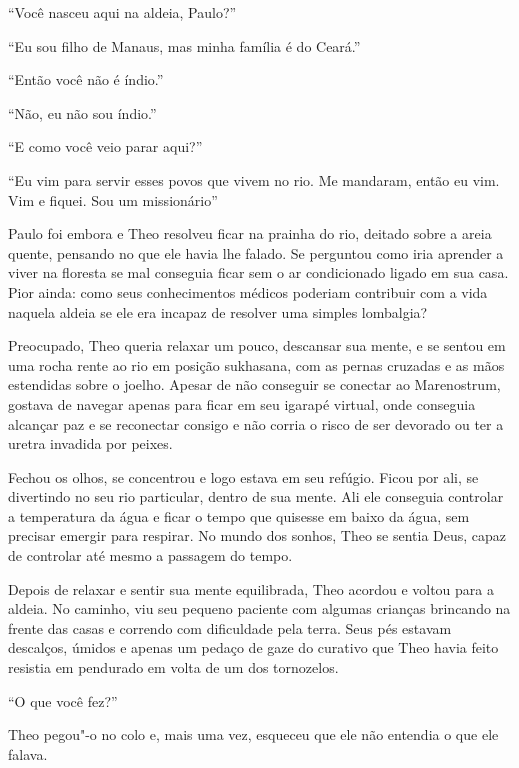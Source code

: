 ``Você nasceu aqui na aldeia, Paulo?''

``Eu sou filho de Manaus, mas minha família é do Ceará.''

``Então você não é índio.''

``Não, eu não sou índio.''

``E como você veio parar aqui?''

``Eu vim para servir esses povos que vivem no rio. Me mandaram, então eu
vim. Vim e fiquei. Sou um missionário''

\asterisc


Paulo foi embora e Theo resolveu ficar na prainha do rio, deitado sobre
a areia quente, pensando no que ele havia lhe falado. Se perguntou como
iria aprender a viver na floresta se mal conseguia ficar sem o ar
condicionado ligado em sua casa. Pior ainda: como seus conhecimentos
médicos poderiam contribuir com a vida naquela aldeia se ele era incapaz
de resolver uma simples lombalgia?

Preocupado, Theo queria relaxar um pouco, descansar sua mente, e se
sentou em uma rocha rente ao rio em posição sukhasana, com as pernas
cruzadas e as mãos estendidas sobre o joelho. Apesar de não conseguir se
conectar ao Marenostrum, gostava de navegar apenas para ficar em seu
igarapé virtual, onde conseguia alcançar paz e se reconectar consigo e
não corria o risco de ser devorado ou ter a uretra invadida por peixes.

Fechou os olhos, se concentrou e logo estava em seu refúgio. Ficou por
ali, se divertindo no seu rio particular, dentro de sua mente. Ali ele
conseguia controlar a temperatura da água e ficar o tempo que quisesse
em baixo da água, sem precisar emergir para respirar. No mundo dos
sonhos, Theo se sentia Deus, capaz de controlar até mesmo a passagem do
tempo.

Depois de relaxar e sentir sua mente equilibrada, Theo acordou e voltou
para a aldeia. No caminho, viu seu pequeno paciente com algumas crianças
brincando na frente das casas e correndo com dificuldade pela terra.
Seus pés estavam descalços, úmidos e apenas um pedaço de gaze do
curativo que Theo havia feito resistia em pendurado em volta de um dos
tornozelos.

``O que você fez?''

Theo pegou"-o no colo e, mais uma vez, esqueceu que ele não entendia o
que ele falava.

